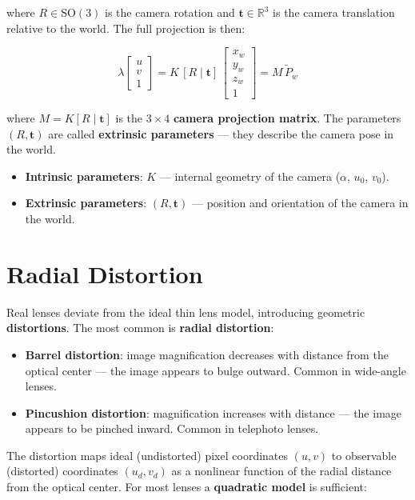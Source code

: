 \documentclass[11pt,a4paper]{article}
\theoremstyle{definition}
\theoremstyle{plain}
\theoremstyle{remark}
\newcommand{\R}{\mathbb{R}}
\newcommand{\SO}[1]{\mathrm{SO}(#1)} %
\newcommand{\p}[1]{\mathbf{#1}}             %
\begin{document}
where $R \in \SO{3}$ is the camera rotation and $\p{t} \in \R^3$ is the camera translation relative to the world. The full projection is then:

\[
\lambda \begin{bmatrix} u \\ v \\ 1 \end{bmatrix}
= K\,[R \mid \p{t}]\,\begin{bmatrix} x_w \\ y_w \\ z_w \\ 1 \end{bmatrix}
= M\,\tilde{P}_w
\]

where $M = K[R \mid \p{t}]$ is the $3 \times 4$ \textbf{camera projection matrix}. The parameters $(R, \p{t})$ are called \textbf{extrinsic parameters} — they describe the camera pose in the world.

\begin{itemize}
    \item \textbf{Intrinsic parameters}: $K$ — internal geometry of the camera ($\alpha$, $u_0$, $v_0$).
    \item \textbf{Extrinsic parameters}: $(R, \p{t})$ — position and orientation of the camera in the world.
\end{itemize}

\section{Radial Distortion}

Real lenses deviate from the ideal thin lens model, introducing geometric \textbf{distortions}. The most common is \textbf{radial distortion}:

\begin{itemize}
    \item \textbf{Barrel distortion}: image magnification decreases with distance from the optical center — the image appears to bulge outward. Common in wide-angle lenses.
    \item \textbf{Pincushion distortion}: magnification increases with distance — the image appears to be pinched inward. Common in telephoto lenses.
\end{itemize}

The distortion maps ideal (undistorted) pixel coordinates $(u, v)$ to observable (distorted) coordinates $(u_d, v_d)$ as a nonlinear function of the radial distance from the optical center. For most lenses a \textbf{quadratic model} is sufficient:
\end{document}
